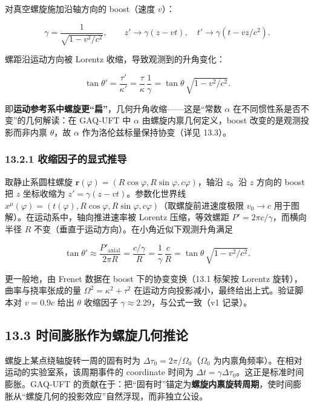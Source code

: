 对真空螺旋施加沿轴方向的 boost（速度 \(v\)）：

\[
\gamma=\frac{1}{\sqrt{1-v^2/c^2}},\qquad z'\to \gamma(z-vt),\quad t'\to\gamma(t-vz/c^2).
\]

螺距沿运动方向被 Lorentz 收缩，导致观测到的升角变化：

\[
\tan\theta' = \frac{\tau'}{\kappa'} = \frac{\tau}{\kappa}\,\frac{1}{\gamma}
= \tan\theta\,\sqrt{1-v^2/c^2}.
\]

即\textbf{运动参考系中螺旋更``扁''}，几何升角收缩------这是``常数
\(\alpha\) 在不同惯性系是否不变''的几何解读：在 GAQ‑UFT 中 \(\alpha\)
由螺旋内禀几何定义，boost 改变的是观测投影而非内禀 \(\theta\)，故
\(\alpha\) 作为洛伦兹标量保持协变（详见 13.3）。

\subsubsection{13.2.1
收缩因子的显式推导}\label{ux6536ux7f29ux56e0ux5b50ux7684ux663eux5f0fux63a8ux5bfc}

取静止系圆柱螺旋
\(\mathbf{r}(\varphi)=(R\cos\varphi,R\sin\varphi,c\varphi)\)，轴沿
\(z\)。沿 \(z\) 方向的 boost 把 \(z\) 坐标收缩为
\(z'=\gamma(z-vt)\)。参数化世界线
\(x^\mu(\varphi)=(t(\varphi),R\cos\varphi,R\sin\varphi,c\varphi)\)（取螺旋前进速度极限
\(v_0\to c\) 用于图解）。在运动系中，轴向推进速率被 Lorentz
压缩，等效螺距 \(P'=2\pi c/\gamma\)，而横向半径 \(R\)
不变（垂直于运动方向）。在小角近似下观测升角满足

\[
\tan\theta' \approx \frac{P'_{\text{axial}}}{2\pi R}
= \frac{c/\gamma}{R}
= \frac{1}{\gamma}\,\frac{c}{R}
= \tan\theta\,\sqrt{1-v^2/c^2}.
\]

更一般地，由 Frenet 数据在 boost 下的协变变换（13.1 标架按 Lorentz
旋转），曲率与挠率张成的量 \(\Omega^2=\kappa^2+\tau^2\)
在运动方向投影减小，最终给出上式。验证脚本对 \(v=0.9c\) 给出 \(\theta\)
收缩因子 \(\gamma\approx2.29\)，与公式一致（v1 记录）。

\subsection{13.3
时间膨胀作为螺旋几何推论}\label{ux65f6ux95f4ux81a8ux80c0ux4f5cux4e3aux87baux65cbux51e0ux4f55ux63a8ux8bba}

螺旋上某点绕轴旋转一周的固有时为
\(\Delta\tau_0=2\pi/\Omega_0\)（\(\Omega_0\)
为内禀角频率）。在相对运动的实验室系，该周期事件的 coordinate 时间为
\(\Delta t=\gamma\Delta\tau_0\)。这正是标准时间膨胀。GAQ‑UFT
的贡献在于：把``固有时''锚定为\textbf{螺旋内禀旋转周期}，使时间膨胀从``螺旋几何的投影效应''自然浮现，而非独立公设。

